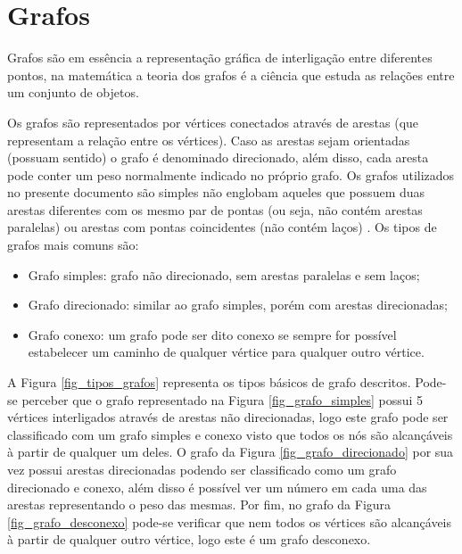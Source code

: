 \section{Grafos}
\label{chap_grafos}
Grafos são em essência a representação gráfica de interligação entre diferentes pontos, na matemática a teoria dos grafos é a ciência que estuda as relações entre um conjunto de objetos.

Os grafos são representados por vértices conectados através de arestas (que representam a relação entre os vértices). Caso as arestas sejam orientadas (possuam sentido) o grafo é denominado direcionado, além disso, cada aresta pode conter um peso normalmente indicado no próprio grafo. Os grafos utilizados no presente documento são simples não englobam aqueles que possuem duas arestas diferentes com os mesmo par de pontas (ou seja, não contém arestas paralelas) ou arestas com pontas coincidentes (não contém laços) \cite{Man-Feofiloff2011}. Os tipos de grafos mais comuns são:

\begin{itemize}
	\item Grafo simples: grafo não direcionado, sem arestas paralelas e sem laços;
	\item Grafo direcionado: similar ao grafo simples, porém com arestas direcionadas;
	\item Grafo conexo: um grafo pode ser dito conexo se sempre for possível estabelecer um caminho de qualquer vértice para qualquer outro vértice.
\end{itemize}

A Figura \ref{fig_tipos_grafos} representa os tipos básicos de grafo descritos. Pode-se perceber que o grafo representado na Figura \ref{fig_grafo_simples} possui 5 vértices interligados através de arestas não direcionadas, logo este grafo pode ser classificado com um grafo simples e conexo visto que todos os nós são alcançáveis à partir de qualquer um deles. O grafo da Figura \ref{fig_grafo_direcionado} por sua vez possui arestas direcionadas podendo ser classificado como um grafo direcionado e conexo, além disso é possível ver um número em cada uma das arestas representando o peso das mesmas. Por fim, no grafo da Figura \ref{fig_grafo_desconexo} pode-se verificar que nem todos os vértices são alcançáveis à partir de qualquer outro vértice, logo este é um grafo desconexo.

